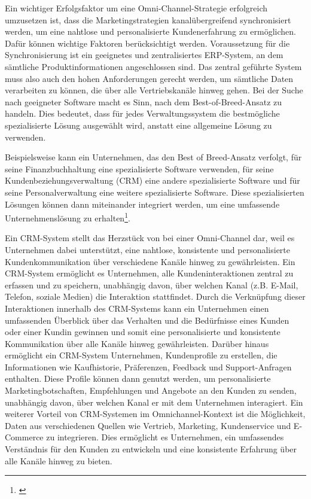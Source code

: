 Ein wichtiger Erfolgsfaktor um eine Omni-Channel-Strategie erfolgreich umzusetzen ist, dass die Marketingstrategien kanalübergreifend synchronisiert werden, um eine nahtlose und personalisierte Kundenerfahrung zu ermöglichen. Dafür können wichtige Faktoren berücksichtigt werden. Voraussetzung für die Synchronisierung ist ein geeignetes und zentralisiertes ERP-System, an dem sämtliche Produktinformationen angeschlossen sind. Das zentral geführte System muss also auch den hohen Anforderungen gerecht werden, um sämtliche Daten verarbeiten zu können, die über alle Vertriebskanäle hinweg gehen. Bei der Suche nach geeigneter Software macht es Sinn, nach dem Best-of-Breed-Ansatz zu handeln. Dies bedeutet, dass für jedes Verwaltungssystem die bestmögliche spezialisierte Lösung ausgewählt wird, anstatt eine allgemeine Lösung zu verwenden.
\newline

Beispielsweise kann ein Unternehmen, das den Best of Breed-Ansatz verfolgt, für seine Finanzbuchhaltung eine spezialisierte Software verwenden, für seine Kundenbeziehungsverwaltung (CRM) eine andere spezialisierte Software und für seine Personalverwaltung eine weitere spezialisierte Software. Diese spezialisierten Lösungen können dann miteinander integriert werden, um eine umfassende Unternehmenslösung zu erhalten\footnote{\autocite [Online] {Woromsbecher2021}}.
\newline

Ein CRM-System stellt das Herzstück von bei einer Omni-Channel dar, weil es Unternehmen dabei unterstützt, eine nahtlose, konsistente und personalisierte Kundenkommunikation über verschiedene Kanäle hinweg zu gewährleisten. Ein CRM-System ermöglicht es Unternehmen, alle Kundeninteraktionen zentral zu erfassen und zu speichern, unabhängig davon, über welchen Kanal (z.B. E-Mail, Telefon, soziale Medien) die Interaktion stattfindet. Durch die Verknüpfung dieser Interaktionen innerhalb des CRM-Systems kann ein Unternehmen einen umfassenden Überblick über das Verhalten und die Bedürfnisse eines Kunden oder einer Kundin gewinnen und somit eine personalisierte und konsistente Kommunikation über alle Kanäle hinweg gewährleisten.
\newline
Darüber hinaus ermöglicht ein CRM-System Unternehmen, Kundenprofile zu erstellen, die Informationen wie Kaufhistorie, Präferenzen, Feedback und Support-Anfragen enthalten. Diese Profile können dann genutzt werden, um personalisierte Marketingbotschaften, Empfehlungen und Angebote an den Kunden zu senden, unabhängig davon, über welchen Kanal er mit dem Unternehmen interagiert.
\newline
Ein weiterer Vorteil von CRM-Systemen im Omnichannel-Kontext ist die Möglichkeit, Daten aus verschiedenen Quellen wie Vertrieb, Marketing, Kundenservice und E-Commerce zu integrieren. Dies ermöglicht es Unternehmen, ein umfassendes Verständnis für den Kunden zu entwickeln und eine konsistente Erfahrung über alle Kanäle hinweg zu bieten.
\newline

